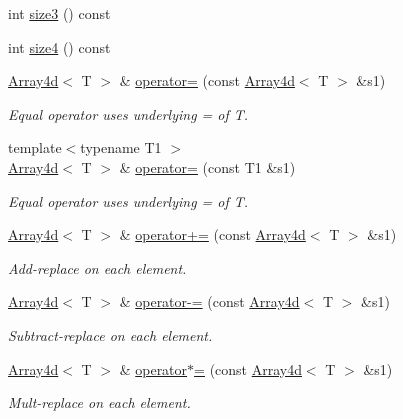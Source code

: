 \begin{DoxyCompactItemize}
\item 
int \mbox{\hyperlink{classXMLArray_1_1Array4d_ae9c6211389f5a1fd2bc756bb5e7b53b1}{size3}} () const
\item 
int \mbox{\hyperlink{classXMLArray_1_1Array4d_abcaa3187b7b1b4b36997937c7597f393}{size4}} () const
\item 
\mbox{\hyperlink{classXMLArray_1_1Array4d}{Array4d}}$<$ T $>$ \& \mbox{\hyperlink{classXMLArray_1_1Array4d_a3231647c370f838502526de102af1b23}{operator=}} (const \mbox{\hyperlink{classXMLArray_1_1Array4d}{Array4d}}$<$ T $>$ \&s1)
\begin{DoxyCompactList}\small\item\em Equal operator uses underlying = of T. \end{DoxyCompactList}\item 
{\footnotesize template$<$typename T1 $>$ }\\\mbox{\hyperlink{classXMLArray_1_1Array4d}{Array4d}}$<$ T $>$ \& \mbox{\hyperlink{classXMLArray_1_1Array4d_a15b8c36a1edd1f72a12301798e0810b5}{operator=}} (const T1 \&s1)
\begin{DoxyCompactList}\small\item\em Equal operator uses underlying = of T. \end{DoxyCompactList}\item 
\mbox{\hyperlink{classXMLArray_1_1Array4d}{Array4d}}$<$ T $>$ \& \mbox{\hyperlink{classXMLArray_1_1Array4d_a3ee4e8302e86bcfec817cae81a5fe1bf}{operator+=}} (const \mbox{\hyperlink{classXMLArray_1_1Array4d}{Array4d}}$<$ T $>$ \&s1)
\begin{DoxyCompactList}\small\item\em Add-\/replace on each element. \end{DoxyCompactList}\item 
\mbox{\hyperlink{classXMLArray_1_1Array4d}{Array4d}}$<$ T $>$ \& \mbox{\hyperlink{classXMLArray_1_1Array4d_ad192d15277494d22a81c86852eaa5466}{operator-\/=}} (const \mbox{\hyperlink{classXMLArray_1_1Array4d}{Array4d}}$<$ T $>$ \&s1)
\begin{DoxyCompactList}\small\item\em Subtract-\/replace on each element. \end{DoxyCompactList}\item 
\mbox{\hyperlink{classXMLArray_1_1Array4d}{Array4d}}$<$ T $>$ \& \mbox{\hyperlink{classXMLArray_1_1Array4d_accb002ecd8742a2aba3e4acaf92963c6}{operator$\ast$=}} (const \mbox{\hyperlink{classXMLArray_1_1Array4d}{Array4d}}$<$ T $>$ \&s1)
\begin{DoxyCompactList}\small\item\em Mult-\/replace on each element. \end{DoxyCompactList}\item 

\end{DoxyCompactItemize}
